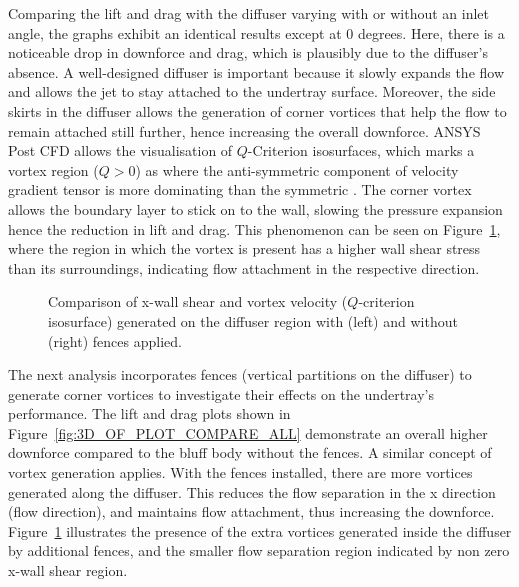 \noindent Comparing the lift and drag with the diffuser varying with or without an inlet angle, the graphs exhibit an identical results except at 0 degrees. Here, there is a noticeable drop in downforce and drag, which is plausibly due to the diffuser's absence. A well-designed diffuser is important because it slowly expands the flow and allows the jet to stay attached to the undertray surface. Moreover, the side skirts in the diffuser allows the generation of corner vortices that help the flow to remain attached still further, hence increasing the overall downforce. ANSYS Post CFD allows the visualisation of $Q$-Criterion isosurfaces, which marks a vortex region ($Q > 0$) as where the anti-symmetric component of velocity gradient tensor is more dominating than the symmetric \cite{Holmen2012MethodsIdentification}. The corner vortex allows the boundary layer to stick on to the wall, slowing the pressure expansion hence the reduction in lift and drag. This phenomenon can be seen on Figure~\ref{fig:3D_OF_COMPARE_FENCES_SHEAR}, where the region in which the vortex is present has a higher wall shear stress than its surroundings, indicating flow attachment in the respective direction.

\begin{figure}[!htb]
    \centering
    \noindent{}
    \caption{Comparison of x-wall shear and vortex velocity ($Q$-criterion isosurface) generated on the diffuser region with (left) and without (right) fences applied.}
      \label{fig:3D_OF_COMPARE_FENCES_SHEAR}
\end{figure}

\noindent The next analysis incorporates fences (vertical partitions on the diffuser) to generate corner vortices to investigate their effects on the undertray's performance. The lift and drag plots shown in Figure~\ref{fig:3D_OF_PLOT_COMPARE_ALL} demonstrate an overall higher downforce compared to the bluff body without the fences. A similar concept of vortex generation applies. With the fences installed, there are more vortices generated along the diffuser. This reduces the flow separation in the x direction (flow direction), and maintains flow attachment, thus increasing the downforce. Figure~\ref{fig:3D_OF_COMPARE_FENCES_SHEAR} illustrates the presence of the extra vortices generated inside the diffuser by additional fences, and the smaller flow separation region indicated by non zero x-wall shear region. 

